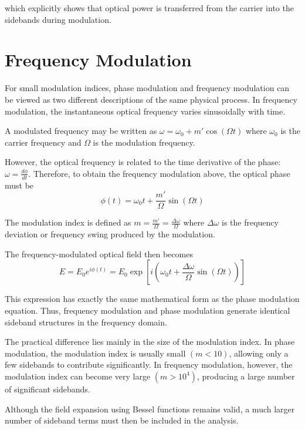 \documentclass{report}
\begin{document}
which explicitly shows that optical power is transferred from the carrier into the sidebands during modulation.

\section{Frequency Modulation}

For small modulation indices, phase modulation and frequency modulation can be viewed as two different descriptions of the same physical process. In frequency modulation, the instantaneous optical frequency varies sinusoidally with time.

A modulated frequency may be written as 
$\omega = \omega_0 + m'\cos(\Omega t)$
where $\omega_0$ is the carrier frequency and $\Omega$ is the modulation frequency.

However, the optical frequency is related to the time derivative of the phase:
$\omega = \frac{d\phi}{dt}$. Therefore, to obtain the frequency modulation above, the optical phase must be
\begin{equation}
\phi(t)
=
\omega_0 t
+
\frac{m'}{\Omega}\sin(\Omega t)
\end{equation}

The modulation index is defined as
$m=\frac{m'}{\Omega}=\frac{\Delta\omega}{\Omega}$
where $\Delta\omega$ is the frequency deviation or frequency swing produced by the modulation.

The frequency-modulated optical field then becomes
\begin{equation}
E
=
E_0 e^{i\phi(t)}
=
E_0
\exp
\left[
i
\left(
\omega_0 t
+
\frac{\Delta\omega}{\Omega}\sin(\Omega t)
\right)
\right]
\end{equation}

This expression has exactly the same mathematical form as the phase modulation equation. Thus, frequency modulation and phase modulation generate identical sideband structures in the frequency domain.

The practical difference lies mainly in the size of the modulation index. In phase modulation, the modulation index is usually small $(m<10)$, allowing only a few sidebands to contribute significantly. In frequency modulation, however, the modulation index can become very large $(m>10^4)$, producing a large number of significant sidebands.

Although the field expansion using Bessel functions remains valid, a much larger number of sideband terms must then be included in the analysis.
\end{document}
